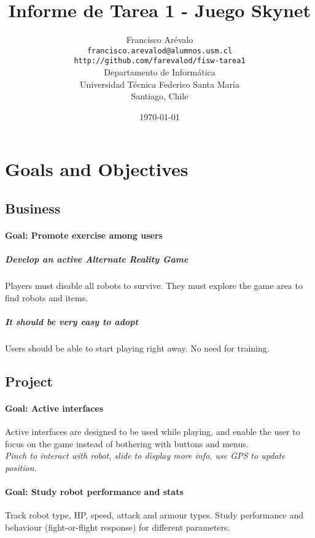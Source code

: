 \documentclass{article}
\begin{document}
\title{Informe de Tarea 1 - Juego Skynet}
\author{Francisco Ar\'evalo\\
  \texttt{francisco.arevalod@alumnos.usm.cl}\\
  \texttt{http://github.com/farevalod/fisw-tarea1}\\
  \vspace{10mm}
  Departamento de Inform\'atica\\
  Universidad T\'ecnica Federico Santa Mar\'ia\\
  Santiago, Chile}
\date{\today}
\maketitle
\tableofcontents
\section{Goals and Objectives}
\subsection{Business}
\paragraph{\textbf{Goal}: Promote exercise among users}
\subparagraph{Develop an active Alternate Reality Game}
Players must disable all robots to survive. They must explore the game area to find robots and items.
\subparagraph{It should be very easy to adopt}
Users should be able to start playing right away. No need for training.
\subsection{Project}
\paragraph{\textbf{Goal}: Active interfaces}
Active interfaces are designed to be used while playing, and enable the user to focus on the game instead of bothering with buttons and menus.\\
\textit{Pinch to interact with robot, slide to display more info, use GPS to update position.}
\paragraph{\textbf{Goal}: Study robot performance and stats}
Track robot type, HP, speed, attack and armour types. Study performance and behaviour (fight-or-flight response) for different parameters.
\end{document}
